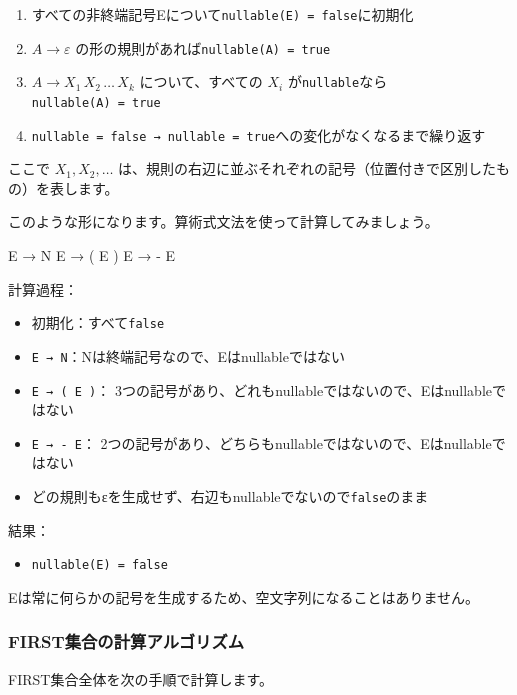 \begin{enumerate}
\item
  すべての非終端記号Eについて\texttt{nullable(E)\ =\ false}に初期化
\item
  \(A \to \varepsilon\) の形の規則があれば\texttt{nullable(A)\ =\ true}
\item
  \(A \to X_1\,X_2\,\ldots\,X_k\) について、すべての \(X_i\)
  が\texttt{nullable}なら\texttt{nullable(A)\ =\ true}
\item
        \texttt{nullable = false →
        nullable = true}への変化がなくなるまで繰り返す
\end{enumerate}

ここで \(X_1, X_2, \ldots\)
は、規則の右辺に並ぶそれぞれの記号（位置付きで区別したもの）を表します。

このような形になります。算術式文法を使って計算してみましょう。

\begin{codescreen}{}
E → N
E → ( E )
E → - E
\end{codescreen}

計算過程：

\begin{itemize}
\item
  初期化：すべて\texttt{false}
\item
  \texttt{E\ →\ N}：Nは終端記号なので、Eはnullableではない
\item
  \texttt{E\ →\ (\ E\ )}：
  3つの記号があり、どれもnullableではないので、Eはnullableではない
\item
  \texttt{E\ →\ -\ E}：
  2つの記号があり、どちらもnullableではないので、Eはnullableではない
\item
  どの規則もεを生成せず、右辺もnullableでないので\texttt{false}のまま
\end{itemize}

結果：

\begin{itemize}
\item
  \texttt{nullable(E)\ =\ false}
\end{itemize}

Eは常に何らかの記号を生成するため、空文字列になることはありません。

\subsubsection{FIRST集合の計算アルゴリズム}

FIRST集合全体を次の手順で計算します。

